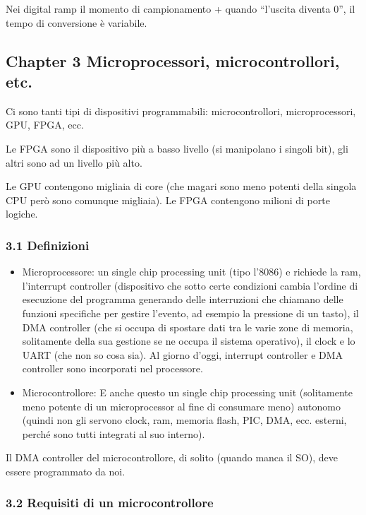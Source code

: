 \documentclass[
]{article}
\providecommand{\tightlist}{%
  \setlength{\itemsep}{0pt}\setlength{\parskip}{0pt}}
\begin{document}
Nei digital ramp il momento di campionamento + quando ``l'uscita diventa
0'', il tempo di conversione è variabile.

\subsection{Chapter 3 Microprocessori, microcontrollori,
etc.}\label{chapter-3-microprocessori-microcontrollori-etc.}

Ci sono tanti tipi di dispositivi programmabili: microcontrollori,
microprocessori, GPU, FPGA, ecc.

Le FPGA sono il dispositivo più a basso livello (si manipolano i singoli
bit), gli altri sono ad un livello più alto.

Le GPU contengono migliaia di core (che magari sono meno potenti della
singola CPU però sono comunque migliaia). Le FPGA contengono milioni di
porte logiche.

\subsubsection{3.1 Definizioni}\label{definizioni}

\begin{itemize}
\tightlist
\item
  Microprocessore: un single chip processing unit (tipo l'8086) e
  richiede la ram, l'interrupt controller (dispositivo che sotto certe
  condizioni cambia l'ordine di esecuzione del programma generando delle
  interruzioni che chiamano delle funzioni specifiche per gestire
  l'evento, ad esempio la pressione di un tasto), il DMA controller (che
  si occupa di spostare dati tra le varie zone di memoria, solitamente
  della sua gestione se ne occupa il sistema operativo), il clock e lo
  UART (che non so cosa sia). Al giorno d'oggi, interrupt controller e
  DMA controller sono incorporati nel processore.
\item
  Microcontrollore: E anche questo un single chip processing unit
  (solitamente meno potente di un microprocessor al fine di consumare
  meno) autonomo (quindi non gli servono clock, ram, memoria flash, PIC,
  DMA, ecc. esterni, perché sono tutti integrati al suo interno).
\end{itemize}

Il DMA controller del microcontrollore, di solito (quando manca il SO),
deve essere programmato da noi.

\subsubsection{3.2 Requisiti di un
microcontrollore}\label{requisiti-di-un-microcontrollore}
\end{document}
